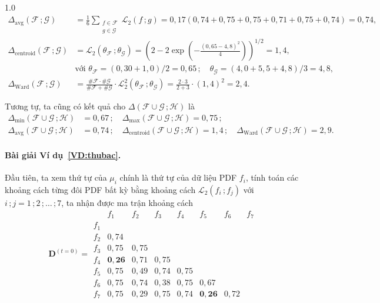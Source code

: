 \documentclass[a4paper,oneside]{book} %
\theoremstyle{plain}
\theoremstyle{plain}
\theoremstyle{nonumberplain}
\begin{document}
\begin{spacing}{1.0}
{\begin{align*}
	\Delta_{\text{avg}}(\mathcal{F}\,; \mathcal{G}) 
	&= \frac{1}{6} \sum_{\substack{f \in \mathcal{F}\\ g \in \mathcal{G}}} \mathcal{L}_2(f\,; g)
	= 0{,}17(0{,}74 + 0{,}75 + 0{,}75 + 0{,}71 + 0{,}75 + 0{,}74) = 0{,}74,\\[3pt]
	\Delta_{\text{centroid}}(\mathcal{F}\,; \mathcal{G})
	&=\mathcal{L}_2(\theta_\mathcal{F}\,; \theta_{\mathcal{G}})
	= \left(2 - 2 \exp\left(-\frac{(0{,}65 - 4{,}8)^2}{4}\right)\right)^{1/2}
	= 1{,}4,\\
	&\text{với } \theta_{\mathcal{F}} = (0{,}30 + 1{,}0)/2 = 0{,}65\,; \quad 
	\theta_{\mathcal{G}} = (4{,}0 + 5{,}5 + 4{,}8)/3 = 4{,}8,\\[3pt]
	\Delta_{\text{Ward}}(\mathcal{F}\,; \mathcal{G}) 
	&= \frac{\#\mathcal{F} \cdot \#\mathcal{G}}{\#\mathcal{F} + \#\mathcal{G}}
	\cdot \mathcal{L}_2^2(\theta_{\mathcal{F}}\,; \theta_{\mathcal{G}})
	= \frac{2 \cdot 3}{2 + 3} \cdot (1{,}4)^2 = 2{,}4.
\end{align*}
}


Tương tự, ta cũng có kết quả cho $\Delta(\mathcal{F}\cup\mathcal{G}\,; \mathcal{H})$ là
\begin{align*}
	\Delta_{\min}(\mathcal{F} \cup \mathcal{G}\,; \mathcal{H}) &= 0{,}67\,; \quad
	\Delta_{\max}(\mathcal{F} \cup \mathcal{G}\,; \mathcal{H}) = 0{,}75\,; \\
	\Delta_{\text{avg}}(\mathcal{F} \cup \mathcal{G}\,; \mathcal{H}) &= 0{,}74\,; \quad
	\Delta_{\text{centroid}}(\mathcal{F} \cup \mathcal{G}\,; \mathcal{H}) = 1{,}4\,; \quad
	\Delta_{\text{Ward}}(\mathcal{F} \cup \mathcal{G}\,; \mathcal{H}) = 2{,}9.
\end{align*}


\paragraph{Bài giải Ví dụ~\ref{VD:thubac}.} Đầu tiên, ta xem thứ tự của $\mu_i$ chính là thứ tự của dữ liệu PDF $f_i$, tính toán các khoảng cách từng đôi PDF bất kỳ bằng khoảng cách $\mathcal{L}_2(f_i\,;f_j)$ với $i\,;j = 1\,;2\,;\ldots\,;7$, ta nhận được ma trận khoảng cách
$$
\bm D^{(t=0)} =
\begin{array}{c|ccccccc}
	& f_1     & f_2     & f_3     & f_4     & f_5     & f_6     & f_7     \\
	\hline
	f_1 &        &        &        &        &        &        &        \\
	f_2 & 0{,}74 &        &        &        &        &        &        \\
	f_3 & 0{,}75 & 0{,}75 &        &        &        &        &        \\
	f_4 & \mathbf{0{,}26} & 0{,}71 & 0{,}75 &        &        &        &        \\
	f_5 & 0{,}75 & 0{,}49 & 0{,}74 & 0{,}75 &        &        &        \\
	f_6 & 0{,}75 & 0{,}74 & 0{,}38 & 0{,}75 & 0{,}67 &        &        \\
	f_7 & 0{,}75 & 0{,}29 & 0{,}75 & 0{,}74 & \mathbf{0{,}26} & 0{,}72 &       
\end{array}
$$


\end{spacing}
\end{document}
